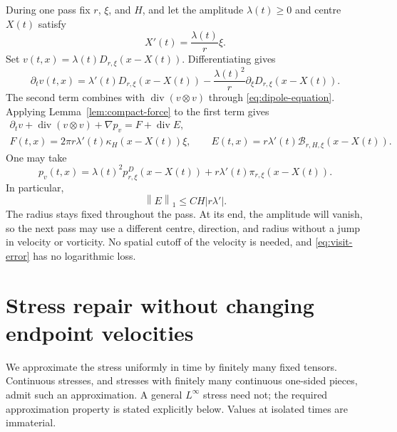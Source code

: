 \documentclass[11pt,a4paper,reqno]{amsart}
\theoremstyle{plain}
\theoremstyle{definition}
\theoremstyle{remark}
\numberwithin{equation}{section}
\newcommand{\Div}{\operatorname{div}}
\newcommand{\norm}[2]{\left\|#1\right\|_{#2}}
\begin{document}
During one pass fix $r$, $\xi$, and $H$, and let the amplitude
$\lambda(t)\ge0$ and centre $X(t)$ satisfy
\[
 X'(t)=\frac{\lambda(t)}r\xi.
\]
Set $v(t,x)=\lambda(t)D_{r,\xi}(x-X(t))$. Differentiating gives
\[
 \partial_tv(t,x)=\lambda'(t)D_{r,\xi}(x-X(t))
 -\frac{\lambda(t)^2}{r}\partial_\xi D_{r,\xi}(x-X(t)).
\]
The second term combines with $\Div(v\otimes v)$ through
\eqref{eq:dipole-equation}. Applying
Lemma~\ref{lem:compact-force} to the first term gives
\begin{equation}\label{eq:visit-equation}
 \begin{gathered}
 \partial_tv+\Div(v\otimes v)+\nabla p_v=F+\Div E,\\
 F(t,x)=2\pi r\lambda'(t)\kappa_H(x-X(t))\xi,\qquad
 E(t,x)=r\lambda'(t)\mathcal B_{r,H,\xi}(x-X(t)).
 \end{gathered}
\end{equation}
One may take
\[
 p_v(t,x)=\lambda(t)^2p^D_{r,\xi}(x-X(t))
              +r\lambda'(t)\pi_{r,\xi}(x-X(t)).
\]
In particular,
\begin{equation}\label{eq:visit-error}
 \norm E1\le CH|r\lambda'|.
\end{equation}
The radius stays fixed throughout the pass. At its end, the amplitude
will vanish, so the next pass may use a different centre, direction,
and radius without a jump in velocity or vorticity. No spatial cutoff
of the velocity is needed, and \eqref{eq:visit-error} has no
logarithmic loss.

\section{Stress repair without changing endpoint velocities}\label{sec:repair}

We approximate the stress uniformly in time by finitely many fixed
tensors. Continuous stresses, and stresses with finitely many
continuous one-sided pieces, admit such an approximation. A general
$L^\infty$ stress need not; the required approximation property is
stated explicitly below. Values at isolated times are immaterial.
\end{document}
